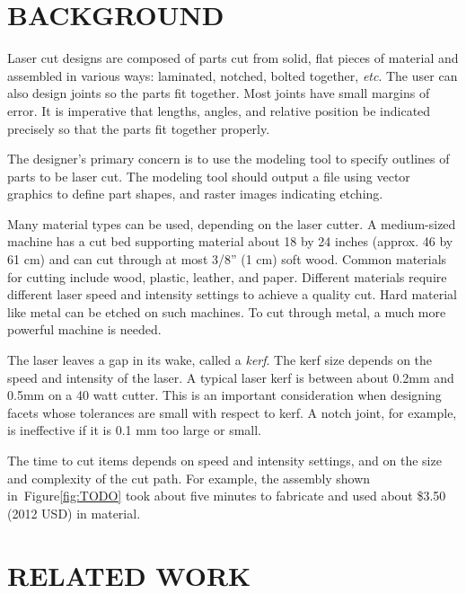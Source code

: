 \documentclass{article}
\begin{document}
\section{BACKGROUND}

Laser cut designs are composed of parts cut from solid, flat pieces of
material and assembled in various ways: laminated, notched, bolted
together, \textit{etc}. The user can also design joints so the parts
fit together. Most joints have small margins of error. It is
imperative that lengths, angles, and relative position be indicated
precisely so that the parts fit together properly.

The designer's primary concern is to use the modeling tool to specify
outlines of parts to be laser cut. The modeling tool should output a
file using vector graphics to define part shapes, and raster images
indicating etching.

Many material types can be used, depending on the laser cutter. A
medium-sized machine has a cut bed supporting material about 18 by 24
inches (approx. 46 by 61 cm) and can cut through at most 3/8'' (1 cm)
soft wood. Common materials for cutting include wood, plastic,
leather, and paper. Different materials require different laser speed
and intensity settings to achieve a quality cut. Hard material like
metal can be etched on such machines. To cut through metal, a much
more powerful machine is needed. 

The laser leaves a gap in its wake, called a \textit{kerf}. The kerf
size depends on the speed and intensity of the laser. A typical laser
kerf is between about 0.2mm and 0.5mm on a 40 watt cutter. This is an
important consideration when designing facets whose tolerances are
small with respect to kerf. A notch joint, for example, is ineffective
if it is 0.1 mm too large or small.

The time to cut items depends on speed and intensity settings, and on
the size and complexity of the cut path. For example, the assembly
shown in~Figure\ref{fig:TODO} took about five minutes to fabricate and
used about \$3.50 (2012 USD) in material. 


\section{RELATED WORK}
\end{document}

